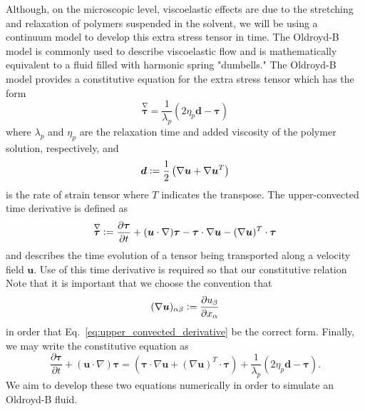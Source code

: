 Although, on the microscopic level, viscoelastic effects are due to the stretching and relaxation of polymers suspended in the solvent, we will be using a continuum model to develop this extra stress tensor in time. The Oldroyd-B model is commonly used to describe viscoelastic flow and is mathematically equivalent to a fluid filled with harmonic spring "dumbells." The Oldroyd-B model provides a constitutive equation for the extra stress tensor which has the form
\begin{equation}\label{eq:short_oldroyd_b}
\overset{\nabla}{\bm{\tau}} = \frac{1}{\lambda_p}\left(2\eta_p\bm{d}- \bm{\tau}\right)
\end{equation}
where $\lambda_p$ and $\eta_p$ are the relaxation time and added viscosity of the polymer solution, respectively, and  
\begin{equation}\label{eq:rate_of_strain}
\bm{d} \vcentcolon= \frac{1}{2}\left(\nabla\bm{u} + \nabla \bm{u}^T\right)
\end{equation}
is the rate of strain tensor where $T$ indicates the transpose. The upper-convected time derivative is defined as
\begin{equation}\label{eq:upper_convected_derivative}
\overset{\nabla}{\bm{\tau}} \vcentcolon= \frac{\partial \bm{\tau}}{\partial t} + (\bm{u} \cdot \nabla)\bm{\tau} - \bm{\tau} \cdot \nabla\bm{u} -(\nabla\bm{u})^T \cdot \bm{\tau}
\end{equation}
and describes the time evolution of a tensor being transported along a velocity field $\bm{u}$. Use of this time derivative is required so that our constitutive relation Note that it is important that we choose the convention that
\begin{equation}\label{eq:gradient_convention}
(\nabla \bm{u})_{\alpha\beta} \vcentcolon= \frac{\partial u_{\beta}}{\partial x_\alpha}
\end{equation}
in order that Eq.~\eqref{eq:upper_convected_derivative} be the correct form. Finally, we may write the constitutive equation as
\begin{equation}\label{eq:full_oldroyd_b}
\frac{\partial \bm{\tau}}{\partial t} + (\bm{u} \cdot \nabla)\bm{\tau}= \left(\bm{\tau} \cdot \nabla\bm{u} +(\nabla\bm{u})^T \cdot \bm{\tau}\right) + \frac{1}{\lambda_p}\left(2\eta_p \bm{d} - \bm{\tau}\right).
\end{equation}
We aim to develop these two equations numerically in order to simulate an Oldroyd-B fluid.